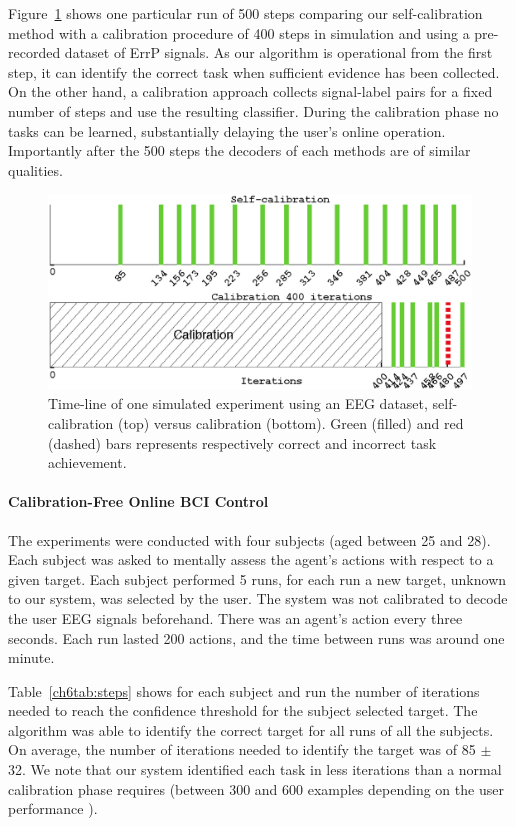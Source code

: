 \documentclass[]{article}
\newcommand{\plotspace}{\vspace{-0.25cm}}
\begin{document}
Figure~\ref{fig:sequence} shows one particular run of 500 steps comparing our self-calibration method with a calibration procedure of 400 steps in simulation and using a pre-recorded dataset of ErrP signals. As our algorithm is operational from the first step, it can identify the correct task when sufficient evidence has been collected. On the other hand, a calibration approach collects signal-label pairs for a fixed number of steps and use the resulting classifier. During the calibration phase no tasks can be learned, substantially delaying the user's online operation. Importantly after the 500 steps the decoders of each methods are of similar qualities.

\begin{figure}[!ht]
\centering
\includegraphics[width=\columnwidth]{img/plot_the_aaai_sequence.eps}
\caption{Time-line of one simulated experiment using an EEG dataset, self-calibration (top) versus calibration (bottom). Green (filled) and red (dashed) bars represents respectively correct and incorrect task achievement. \plotspace}
\label{fig:sequence}
\end{figure}

\paragraph{Calibration-Free Online BCI Control}

The experiments were conducted with four subjects (aged between 25 and 28). Each subject was asked to mentally assess the agent's actions with respect to a given target. Each subject performed 5 runs, for each run a new target, unknown to our system, was selected by the user. The system was not calibrated to decode the user EEG signals beforehand. There was an agent's action every three seconds. Each run lasted 200 actions, and the time between runs was around one minute.

Table~\ref{ch6tab:steps} shows for each subject and run the number of iterations needed to reach the confidence threshold for the subject selected target. The algorithm was able to identify the correct target for all runs of all the subjects.  On average, the number of iterations needed to identify the target was of 85 $\pm$ 32. We note that our system identified each task in less iterations than a normal calibration phase requires (between 300 and 600 examples depending on the user performance \cite{chavarriaga2010learning,iturrate2010single}).
\end{document}
